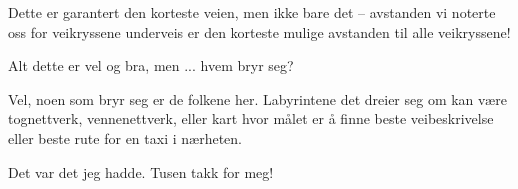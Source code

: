 \documentclass{article}
\newcommand{\hl}[2][primary-dark]{\textcolor{#1}{#2}}
\begin{document}
Dette er \hl{garantert} den korteste veien, men ikke bare det -- avstanden vi noterte oss for veikryssene underveis er den korteste mulige avstanden til \hl{alle} veikryssene!

Alt dette er vel og bra, men ... \hl{hvem} bryr seg?

Vel, noen som bryr seg er \hl{de} folkene her. Labyrintene det dreier seg om kan være \hl{tognettverk}, \hl{vennenettverk}, eller kart hvor målet er å finne beste \hl{veibeskrivelse} eller beste rute for en \hl{taxi} i nærheten.

Det var det jeg hadde. \hl{Tusen} takk for meg!
\end{document}
